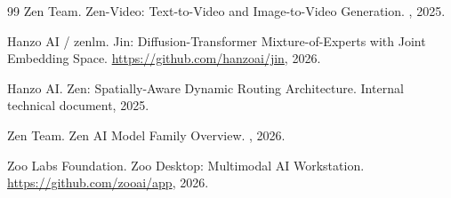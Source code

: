 \documentclass[11pt,a4paper]{article}
\begin{document}
\begin{thebibliography}{99}
Zen Team.
\newblock Zen-Video: Text-to-Video and Image-to-Video Generation.
, 2025.

Hanzo AI / zenlm.
\newblock Jin: Diffusion-Transformer Mixture-of-Experts with Joint Embedding Space.
\newblock \url{https://github.com/hanzoai/jin}, 2026.

Hanzo AI.
\newblock Zen: Spatially-Aware Dynamic Routing Architecture.
\newblock Internal technical document, 2025.

Zen Team.
\newblock Zen AI Model Family Overview.
, 2026.

Zoo Labs Foundation.
\newblock Zoo Desktop: Multimodal AI Workstation.
\newblock \url{https://github.com/zooai/app}, 2026.

\end{thebibliography}
\end{document}
